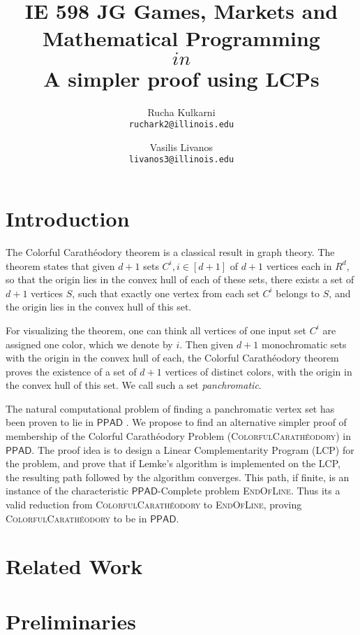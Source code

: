\documentclass[a4paper,11pt]{article}
\title{IE 598 JG Games, Markets and Mathematical Programming \\ \CCP $in$ \PPAD \\ A simpler proof using LCPs}
\author{
	{\sc Rucha Kulkarni} \\
	\texttt{ruchark2@illinois.edu}
	\and
	{\sc Vasilis Livanos} \\
	\texttt{livanos3@illinois.edu}
}
\date{}
\def\cc#1{\mathsf{#1}}
\def\PPAD{\ensuremath{\cc{PPAD}}\xspace}
\def\problem#1{\textsc{#1}}
\def\EOL{\problem{EndOfLine}\xspace}
\def\CC{Colorful Carath\'eodory }
\def\CCP{\problem{ColorfulCarath\'eodory}\xspace}
\begin{document}
 \maketitle

\section{Introduction}


\par The \CC theorem is a classical result in graph theory. The theorem states that given $d+1$ sets
$C^i, i \in [d+1]$ of $d+1$ vertices each in $R^d$, so that the origin lies in the convex hull of each of
these sets, there exists a set of $d+1$ vertices $S$, such that exactly one vertex from each set $C^i$
belongs to $S$, and the origin lies in the convex hull of this set.

\par For visualizing the theorem, one can think all vertices of one input set $C^i$ are assigned one color,
which we denote by $i$. Then given $d+1$ monochromatic sets with the origin in the convex hull of each, the
\CC theorem proves the existence of a set of $d+1$ vertices of distinct colors, with the origin in the convex
hull of this set. We call such a set \textit{panchromatic}.

\par The natural computational problem of finding a panchromatic vertex set has been proven to lie in \PPAD
\cite{CCP_PPAD}. We propose to find an alternative simpler proof of membership of the \CC Problem (\CCP) in
\PPAD. The proof idea is to design a Linear Complementarity Program (LCP) for the problem, and prove that if
Lemke's algorithm is implemented on the LCP, the resulting path followed by the algorithm converges. This path,
if finite, is an instance of the characteristic \PPAD-Complete problem \EOL. Thus its a valid reduction from
\CCP to \EOL, proving \CCP to be in \PPAD.

\section{Related Work}


\section{Preliminaries}
\end{document}
